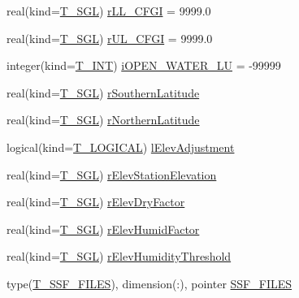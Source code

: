 \begin{DoxyCompactItemize}
real(kind=\hyperlink{namespacetest_a04d8b9090502de3a00046fe904bc3d99}{T\_\-SGL}) \hyperlink{typetest_1_1_t___m_o_d_e_l___c_o_n_f_i_g_u_r_a_t_i_o_n_a33b533e838dfee9e39017329921f159c}{rLL\_\-CFGI} = 9999.0
\item 
real(kind=\hyperlink{namespacetest_a04d8b9090502de3a00046fe904bc3d99}{T\_\-SGL}) \hyperlink{typetest_1_1_t___m_o_d_e_l___c_o_n_f_i_g_u_r_a_t_i_o_n_a6b381e0936d42bac6388ac9a29b44e3c}{rUL\_\-CFGI} = 9999.0
\item 
integer(kind=\hyperlink{namespacetest_a6f91ebd89b58cfcc5da99faed9385c1e}{T\_\-INT}) \hyperlink{typetest_1_1_t___m_o_d_e_l___c_o_n_f_i_g_u_r_a_t_i_o_n_a285c5ca0adeeda71575803ee388aab9a}{iOPEN\_\-WATER\_\-LU} = -\/99999
\item 
real(kind=\hyperlink{namespacetest_a04d8b9090502de3a00046fe904bc3d99}{T\_\-SGL}) \hyperlink{typetest_1_1_t___m_o_d_e_l___c_o_n_f_i_g_u_r_a_t_i_o_n_ae5b4331c980a9a71eb40710a3cd325cb}{rSouthernLatitude}
\item 
real(kind=\hyperlink{namespacetest_a04d8b9090502de3a00046fe904bc3d99}{T\_\-SGL}) \hyperlink{typetest_1_1_t___m_o_d_e_l___c_o_n_f_i_g_u_r_a_t_i_o_n_a07d016cbd947b4239f5336eb37a5b7f3}{rNorthernLatitude}
\item 
logical(kind=\hyperlink{namespacetest_acdeac586276a7d1d394fb5eddc77fc3d}{T\_\-LOGICAL}) \hyperlink{typetest_1_1_t___m_o_d_e_l___c_o_n_f_i_g_u_r_a_t_i_o_n_a0488eee4d6a1bda565e5066642c52f0a}{lElevAdjustment}
\item 
real(kind=\hyperlink{namespacetest_a04d8b9090502de3a00046fe904bc3d99}{T\_\-SGL}) \hyperlink{typetest_1_1_t___m_o_d_e_l___c_o_n_f_i_g_u_r_a_t_i_o_n_a193e6b6383fe1b9dfdef433889a4ca46}{rElevStationElevation}
\item 
real(kind=\hyperlink{namespacetest_a04d8b9090502de3a00046fe904bc3d99}{T\_\-SGL}) \hyperlink{typetest_1_1_t___m_o_d_e_l___c_o_n_f_i_g_u_r_a_t_i_o_n_ac4068309d8e3265a9a2b57b1788d6f50}{rElevDryFactor}
\item 
real(kind=\hyperlink{namespacetest_a04d8b9090502de3a00046fe904bc3d99}{T\_\-SGL}) \hyperlink{typetest_1_1_t___m_o_d_e_l___c_o_n_f_i_g_u_r_a_t_i_o_n_abf728571c92516aee194d82c9bd9017e}{rElevHumidFactor}
\item 
real(kind=\hyperlink{namespacetest_a04d8b9090502de3a00046fe904bc3d99}{T\_\-SGL}) \hyperlink{typetest_1_1_t___m_o_d_e_l___c_o_n_f_i_g_u_r_a_t_i_o_n_ace5e03b5eb7f036eb315d329cb80d238}{rElevHumidityThreshold}
\item 
type(\hyperlink{typetest_1_1_t___s_s_f___f_i_l_e_s}{T\_\-SSF\_\-FILES}), dimension(:), pointer \hyperlink{typetest_1_1_t___m_o_d_e_l___c_o_n_f_i_g_u_r_a_t_i_o_n_a70158cc60f405c3d5e5f08d3b99b0a5b}{SSF\_\-FILES}

\end{DoxyCompactItemize}
